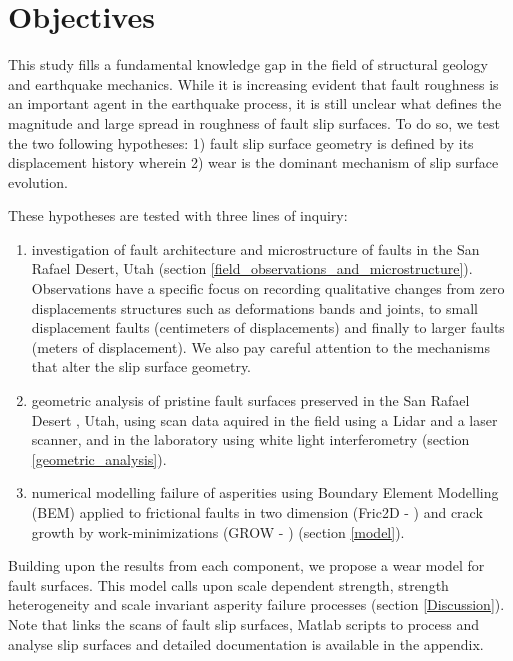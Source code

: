 \documentclass[12pt,a4paper]{article}
\begin{document}




\section{Objectives}

This study fills a fundamental knowledge gap in the field of structural geology and earthquake mechanics. While it is increasing evident that fault roughness is an important agent in the earthquake process, it is still unclear what defines the magnitude and large spread in roughness of fault slip surfaces. To do so, we test the two following hypotheses: 1) fault slip surface geometry is defined by its displacement history wherein 2) wear is the dominant mechanism of slip surface evolution.
	
	These hypotheses are tested with three lines of inquiry:
	
\begin{enumerate}
	\item investigation of fault architecture and microstructure of faults in the San Rafael Desert, Utah (section \ref{field_observations_and_microstructure}). Observations have a specific focus on recording qualitative changes from zero displacements structures such as deformations bands and joints, to small displacement faults (centimeters of displacements) and finally to larger faults (meters of displacement). We also pay careful attention to the mechanisms that alter the slip surface geometry.
	\item  geometric analysis of pristine fault surfaces preserved in the San Rafael Desert , Utah, using scan data aquired in the field using a Lidar and a laser scanner, and in the laboratory using white light interferometry (section \ref{geometric_analysis}). 
	\item numerical modelling failure of asperities using Boundary Element Modelling (BEM) applied to frictional faults in two dimension (Fric2D - \cite{crouch1982boundary, cooke1997bedding, cooke1997fracture, savage2010unlocking}) and crack growth by work-minimizations (GROW - \cite{mcbeck2016growth}) (section \ref{model}).
\end{enumerate}

	Building upon the results from each component, we propose a wear model for fault surfaces. This model calls upon scale dependent strength, strength heterogeneity and scale invariant asperity failure processes (section \ref{Discussion}). Note that links the scans of fault slip surfaces, Matlab scripts to process and analyse slip surfaces and detailed documentation is available in the appendix.
\end{document}
